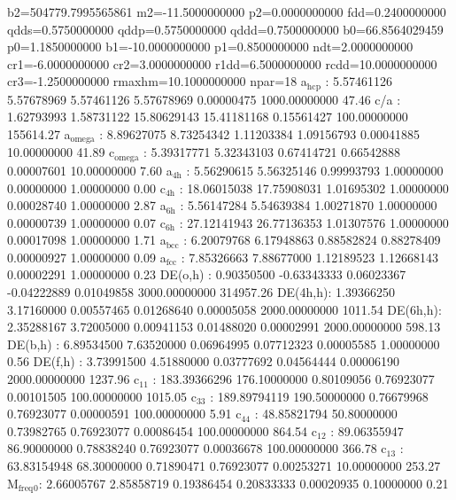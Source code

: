 \documentclass[11pt]{article}
\begin{document}
b2=504779.7995565861 m2=-11.5000000000 p2=0.0000000000 fdd=0.2400000000 qdds=0.5750000000 qddp=0.5750000000 qddd=0.7500000000 b0=66.8564029459 p0=1.1850000000 b1=-10.0000000000 p1=0.8500000000 ndt=2.0000000000 cr1=-6.0000000000 cr2=3.0000000000 r1dd=6.5000000000 rcdd=10.0000000000 cr3=-1.2500000000 rmaxhm=10.1000000000 npar=18
 a\(_{\text{hcp}}\)   :   5.57461126   5.57678969   5.57461126   5.57678969   0.00000475 1000.00000000        47.46
 c/a     :   1.62793993   1.58731122  15.80629143  15.41181168   0.15561427 100.00000000    155614.27
 a\(_{\text{omega}}\) :   8.89627075   8.73254342   1.11203384   1.09156793   0.00041885  10.00000000        41.89
 c\(_{\text{omega}}\) :   5.39317771   5.32343103   0.67414721   0.66542888   0.00007601  10.00000000         7.60
 a\(_{\text{4h}}\)    :   5.56290615   5.56325146   0.99993793   1.00000000   0.00000000   1.00000000         0.00
 c\(_{\text{4h}}\)    :  18.06015038  17.75908031   1.01695302   1.00000000   0.00028740   1.00000000         2.87
 a\(_{\text{6h}}\)    :   5.56147284   5.54639384   1.00271870   1.00000000   0.00000739   1.00000000         0.07
 c\(_{\text{6h}}\)    :  27.12141943  26.77136353   1.01307576   1.00000000   0.00017098   1.00000000         1.71
 a\(_{\text{bcc}}\)   :   6.20079768   6.17948863   0.88582824   0.88278409   0.00000927   1.00000000         0.09
 a\(_{\text{fcc}}\)   :   7.85326663   7.88677000   1.12189523   1.12668143   0.00002291   1.00000000         0.23
 DE(o,h) :   0.90350500  -0.63343333   0.06023367  -0.04222889   0.01049858 3000.00000000    314957.26
 DE(4h,h):   1.39366250   3.17160000   0.00557465   0.01268640   0.00005058 2000.00000000      1011.54
 DE(6h,h):   2.35288167   3.72005000   0.00941153   0.01488020   0.00002991 2000.00000000       598.13
 DE(b,h) :   6.89534500   7.63520000   0.06964995   0.07712323   0.00005585   1.00000000         0.56
 DE(f,h) :   3.73991500   4.51880000   0.03777692   0.04564444   0.00006190 2000.00000000      1237.96
 c\(_{\text{11}}\)    : 183.39366296 176.10000000   0.80109056   0.76923077   0.00101505 100.00000000      1015.05
 c\(_{\text{33}}\)    : 189.89794119 190.50000000   0.76679968   0.76923077   0.00000591 100.00000000         5.91
 c\(_{\text{44}}\)    :  48.85821794  50.80000000   0.73982765   0.76923077   0.00086454 100.00000000       864.54
 c\(_{\text{12}}\)    :  89.06355947  86.90000000   0.78838240   0.76923077   0.00036678 100.00000000       366.78
 c\(_{\text{13}}\)    :  63.83154948  68.30000000   0.71890471   0.76923077   0.00253271  10.00000000       253.27
 M\(_{\text{freq}}\)\(_{\text{0}}\):   2.66005767   2.85858719   0.19386454   0.20833333   0.00020935   0.10000000         0.21
\end{document}
